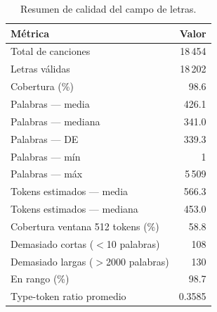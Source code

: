 \begin{table}[htbp]
\centering
\caption{Resumen de calidad del campo de letras.}
\label{tab:lyrics_quality}
\begin{tabular}{lr}
\toprule
Métrica & Valor \\
\midrule
Total de canciones & 18\,454 \\
Letras válidas & 18\,202 \\
Cobertura (\%) & 98.6 \\
\midrule
Palabras --- media & 426.1 \\
Palabras --- mediana & 341.0 \\
Palabras --- DE & 339.3 \\
Palabras --- mín & 1 \\
Palabras --- máx & 5\,509 \\
\midrule
Tokens estimados --- media & 566.3 \\
Tokens estimados --- mediana & 453.0 \\
Cobertura ventana 512 tokens (\%) & 58.8 \\
\midrule
Demasiado cortas ($<$10 palabras) & 108 \\
Demasiado largas ($>$2000 palabras) & 130 \\
En rango (\%) & 98.7 \\
\midrule
Type-token ratio promedio & 0.3585 \\
\bottomrule
\end{tabular}
\end{table}